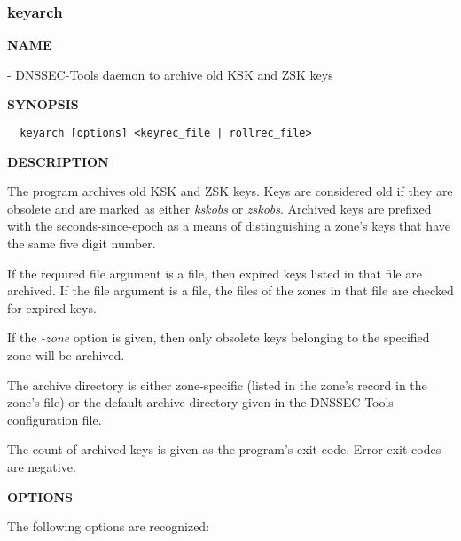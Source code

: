 \clearpage

\subsubsection{keyarch}

{\bf NAME}

 - DNSSEC-Tools daemon to archive old KSK and ZSK keys

{\bf SYNOPSIS}

\begin{verbatim}
  keyarch [options] <keyrec_file | rollrec_file>
\end{verbatim}

{\bf DESCRIPTION}

The  program archives old KSK and ZSK keys.  Keys are considered
old if they are obsolete and are marked as either {\it kskobs} or {\it zskobs}.
Archived keys are prefixed with the seconds-since-epoch as a means of
distinguishing a zone's keys that have the same five digit number.

If the required file argument is a  file, then expired keys
listed in that file are archived.  If the file argument is a 
file, the  files of the zones in that file are checked for
expired keys.

If the {\it -zone} option is given, then only obsolete keys belonging to the
specified zone will be archived.

The archive directory is either zone-specific (listed in the zone's
 record in the zone's  file) or the default
archive directory given in the DNSSEC-Tools configuration file.

The count of archived keys is given as the program's exit code.  Error exit
codes are negative. 

{\bf OPTIONS}

The following options are recognized:

